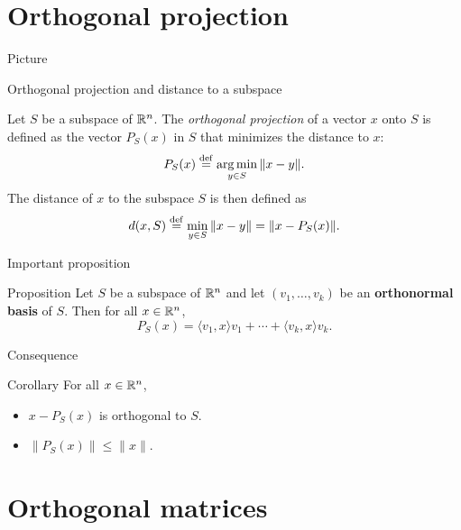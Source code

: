 \documentclass{beamer}
\begin{document}
\section{Orthogonal projection}

\begin{frame}[t]{Picture}
	\grid

\end{frame}

\begin{frame}[t]{Orthogonal projection and distance to a subspace}
	\begin{definition}
		Let $S$ be a subspace of $\mathbb{R}^n$. The \emph{orthogonal projection} of a vector $x$ onto $S$ is defined as the vector $P_S(x)$ in $S$ that minimizes the distance to $x$:
		$$
		P_S(x) \overset{\rm def}{=} \operatorname*{arg\,min}_{y \in S} \|x - y\|.
		$$
		The distance of $x$ to the subspace $S$ is then defined as
		$$
		d(x,S) \overset{\rm def}{=} \min_{y \in S} \| x - y \| = \|x - P_S(x)\|.
		$$
	\end{definition}
\end{frame}

\begin{frame}[t]{Important proposition}
	\grid 

	\vspace{-0.4cm}
	\begin{block}{Proposition}
		Let $S$ be a subspace of $\mathbb{R}^n$ and let $(v_1, \dots, v_k)$ be an \textbf{orthonormal basis} of $S$. Then for all $x \in \mathbb{R}^n$,
		$$P_S(x) = \langle v_1, x \rangle v_1 + \cdots + \langle v_k, x \rangle v_k.$$
	\end{block}
\end{frame}



\begin{frame}[t]{Consequence}
	\grid

	\vspace{-0.4cm}
	\begin{block}{Corollary}
		For all $x \in \mathbb{R}^n$,
		\begin{itemize}
			\item $x - P_S(x)$ is orthogonal to $S$.
			\item $\|P_S(x) \| \leq \|x\|$.
		\end{itemize}
	\end{block}
\end{frame}


\section{Orthogonal matrices}
\end{document}
